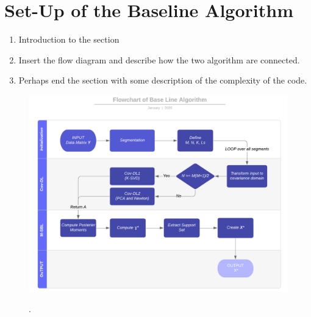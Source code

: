 \section{Set-Up of the Baseline Algorithm}
\begin{enumerate}
\item Introduction to the section
\item Insert the flow diagram and describe how the two algorithm are connected.
\item Perhaps end the section with some description of the complexity of the code.
\end{enumerate}

\begin{figure}[H]
\centering
\includegraphics[scale=0.5]{figures/chapter6/Flowchart.png}
\label{fig:flow}
\caption{.}
\end{figure}
\noindent
